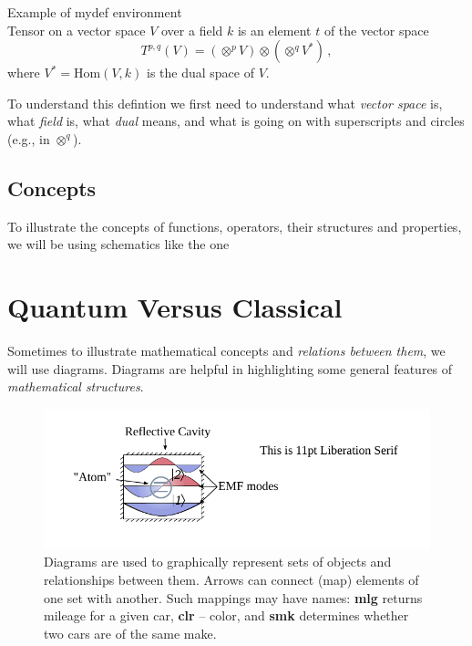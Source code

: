 \begin{mydef}{Example of mydef environment}\\
  \small
Tensor on a vector space $V$ over a field $k$ is an element $t$ of the
vector space
\begin{equation*}
	T^{p,q} (V) = (\otimes^p V)\otimes (\otimes^q V^*)\,,
\end{equation*}
where $V^*=\textrm{Hom}(V, k)$ is the dual space of $V$.
\label{tcb:tensorDefinition1}
\end{mydef}
To understand this defintion we first need to understand what
\emph{vector space} is, what \emph{field} is, what \emph{dual} means,
and what is going on with superscripts and circles (e.g., in
$\otimes^q$).

\subsection{Concepts}
To illustrate the concepts of functions, operators, their structures and
properties, we will be using schematics like the one


\section{Quantum Versus Classical}
Sometimes to illustrate mathematical concepts and \emph{relations between them},
we will use diagrams. Diagrams are helpful in highlighting
some general features of \emph{mathematical structures}.

\begin{figure}[htbp]
  \centering
  \includegraphics[scale=1.0]{defaultFigureTemplate}
  \caption{Diagrams are used to graphically represent sets of objects
    and relationships between them. Arrows can connect (map) elements
    of one set with another. Such mappings may have names: {\bf mlg}
    returns mileage for a given car, {\bf clr} -- color, and {\bf smk}
  determines whether two cars are of the same make.}
  \label{fig:diagrams}
\end{figure}

